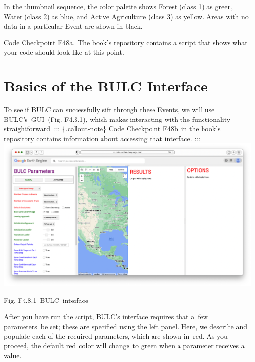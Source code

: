 \documentclass[
  letterpaper,
  DIV=11,
  numbers=noendperiod]{scrreprt}
\begin{document}
In the thumbnail sequence, the color palette shows Forest (class 1) as
green, Water (class 2) as blue, and Active Agriculture (class 3) as
yellow. Areas with no data in a particular Event are shown in black.

\begin{tcolorbox}[enhanced jigsaw, left=2mm, breakable, rightrule=.15mm, opacityback=0, colframe=quarto-callout-note-color-frame, colbacktitle=quarto-callout-note-color!10!white, arc=.35mm, opacitybacktitle=0.6, toptitle=1mm, colback=white, leftrule=.75mm, title=\textcolor{quarto-callout-note-color}{\faInfo}\hspace{0.5em}{Note}, toprule=.15mm, bottomtitle=1mm, titlerule=0mm, bottomrule=.15mm, coltitle=black]

Code Checkpoint F48a.~The book's repository contains a script that shows
what your code should look like at this point.

\end{tcolorbox}

\hypertarget{basics-of-the-bulc-interface}{%
\section{Basics of the BULC
Interface}\label{basics-of-the-bulc-interface}}

To see if BULC can successfully sift through these Events, we will use
BULC's~GUI~(Fig. F4.8.1), which makes interacting with the functionality
straightforward. ::: \{.callout-note\} Code Checkpoint F48b~in the
book's repository contains information about accessing that interface.
::: \includegraphics{./F4/image5.png}

Fig. F4.8.1~BULC~interface

After you have run the script, BULC's interface requires that a~few
parameters~be set; these are specified using the left panel. Here, we
describe and populate each of the required parameters, which are shown
in~red. As you proceed, the default red~color will change~to green when
a parameter receives a value.
\end{document}
